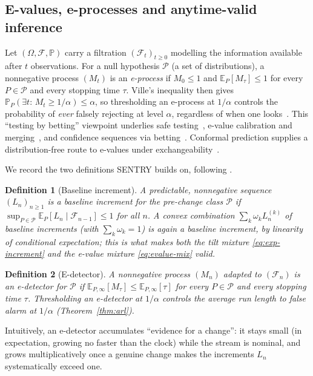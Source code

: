 \documentclass[pdflatex,sn-mathphys-num]{sn-jnl}%
\theoremstyle{thmstyleone}%
\theoremstyle{thmstyletwo}%
\theoremstyle{thmstylethree}%
\newtheorem{definition}{Definition}%
\newcommand{\Ecal}{\mathbb{E}}
\newcommand{\Pcal}{\mathcal{P}}
\newcommand{\Fcal}{\mathcal{F}}
\newcommand{\Prob}{\mathbb{P}}
\begin{document}
\subsection{E-values, e-processes and anytime-valid inference}

Let \((\Omega,\Fcal,\Prob)\) carry a filtration \((\Fcal_t)_{t\ge 0}\)
modelling the information available after \(t\) observations. For a null
hypothesis \(\Pcal\) (a set of distributions), a nonnegative process
\((M_t)\) is an \emph{e-process} if \(M_0\le 1\) and \(\Ecal_P[M_\tau]\le 1\)
for every \(P\in\Pcal\) and every stopping time \(\tau\). Ville's inequality
then gives \(\Prob_P(\exists t:\, M_t \ge 1/\alpha)\le\alpha\), so
thresholding an e-process at \(1/\alpha\) controls the probability of \emph{ever}
falsely rejecting at level \(\alpha\), regardless of when one
looks~\cite{ramdas2023gametheoretic}. This ``testing by betting'' viewpoint
underlies safe testing~\cite{grunwald2024safetesting}, e-value
calibration and merging~\cite{vovk2021evalues}, and confidence sequences via
betting~\cite{waudbysmith2023betting}. Conformal prediction supplies a
distribution-free route to e-values under
exchangeability~\cite{vovk2022algorithmic}.

We record the two definitions SENTRY builds on, following
\cite{shin2023edetectors}.

\begin{definition}[Baseline increment]\label{def:increment}
A predictable, nonnegative sequence \((L_n)_{n\ge 1}\) is a \emph{baseline
increment} for the pre-change class \(\Pcal\) if
\(\sup_{P\in\Pcal}\Ecal_{P}[L_n\mid\Fcal_{n-1}]\le 1\) for all \(n\). A convex
combination \(\sum_k\omega_k L_n^{(k)}\) of baseline increments (with
\(\sum_k\omega_k=1\)) is again a baseline increment, by linearity of
conditional expectation; this is what makes both the tilt mixture
\eqref{eq:exp-increment} and the e-value mixture \eqref{eq:evalue-mix} valid.
\end{definition}

\begin{definition}[E-detector]\label{def:edetector}
A nonnegative process \((M_n)\) adapted to \((\Fcal_n)\) is an
\emph{e-detector} for \(\Pcal\) if \(\Ecal_{P,\infty}[M_\tau]\le
\Ecal_{P,\infty}[\tau]\) for every \(P\in\Pcal\) and every stopping time
\(\tau\). Thresholding an e-detector at \(1/\alpha\) controls the average run
length to false alarm at \(1/\alpha\) (Theorem~\ref{thm:arl}).
\end{definition}

Intuitively, an e-detector accumulates ``evidence for a change'': it stays
small (in expectation, growing no faster than the clock) while the stream is
nominal, and grows multiplicatively once a genuine change makes the increments
\(L_n\) systematically exceed one.
\end{document}
